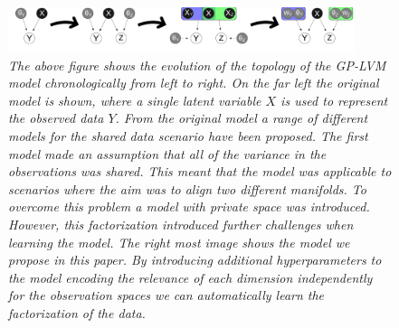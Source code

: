 %
%
%
%
%
%

\begin{figure}
  \begin{center}
    \includegraphics[width=0.9\textwidth]{bin/graphicalmodel.pdf}
  \end{center}
  \vspace{-8pt}
  \caption{\small {\it The above figure shows the evolution of the
      topology of the GP-LVM model chronologically from left to
      right. On the far left the original model is shown, where a
      single latent variable $X$ is used to represent the
      observed data $Y$. From the original model a range of
      different models for the shared data scenario have been
      proposed. The first model made an assumption that all of the
      variance in the observations was shared. This meant that the
      model was applicable to scenarios where the aim was to align two
      different manifolds. To overcome this problem a model with
      private space was introduced. However, this factorization
      introduced further challenges when learning the model. The right
      most image shows the model we propose in this paper. By
      introducing additional hyperparameters to the model encoding the
      relevance of each dimension independently for the observation
      spaces we can automatically learn the factorization of the data.
  }}
 \label{fig:grModel}
\end{figure}

